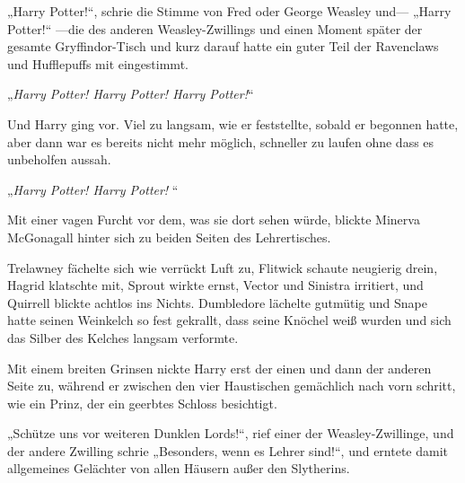 „Harry Potter!“, schrie die Stimme von Fred oder George Weasley und— „Harry Potter!“ —die des anderen Weasley-Zwillings und einen Moment später der gesamte Gryffindor-Tisch und kurz darauf hatte ein guter Teil der Ravenclaws und Hufflepuffs mit eingestimmt.

„\emph{Harry Potter! Harry Potter! Harry Potter!}“

Und Harry ging vor. Viel zu langsam, wie er feststellte, sobald er begonnen hatte, aber dann war es bereits nicht mehr möglich, schneller zu laufen ohne dass es unbeholfen aussah.

\later

„\emph{Harry Potter! Harry Potter! }“


Mit einer vagen Furcht vor dem, was sie dort sehen würde, blickte Minerva McGonagall hinter sich zu beiden Seiten des Lehrertisches.

Trelawney fächelte sich wie verrückt Luft zu, Flitwick schaute neugierig drein, Hagrid klatschte mit, Sprout wirkte ernst, Vector und Sinistra irritiert, und Quirrell blickte achtlos ins Nichts. Dumbledore lächelte gutmütig und Snape hatte seinen Weinkelch so fest gekrallt, dass seine Knöchel weiß wurden und sich das Silber des Kelches langsam verformte.

Mit einem breiten Grinsen nickte Harry erst der einen und dann der anderen Seite zu, während er zwischen den vier Haustischen gemächlich nach vorn schritt, wie ein Prinz, der ein geerbtes Schloss besichtigt.

„Schütze uns vor weiteren Dunklen Lords!“, rief einer der Weasley-Zwillinge, und der andere Zwilling schrie „Besonders, wenn es Lehrer sind!“, und erntete damit allgemeines Gelächter von allen Häusern außer den Slytherins.


